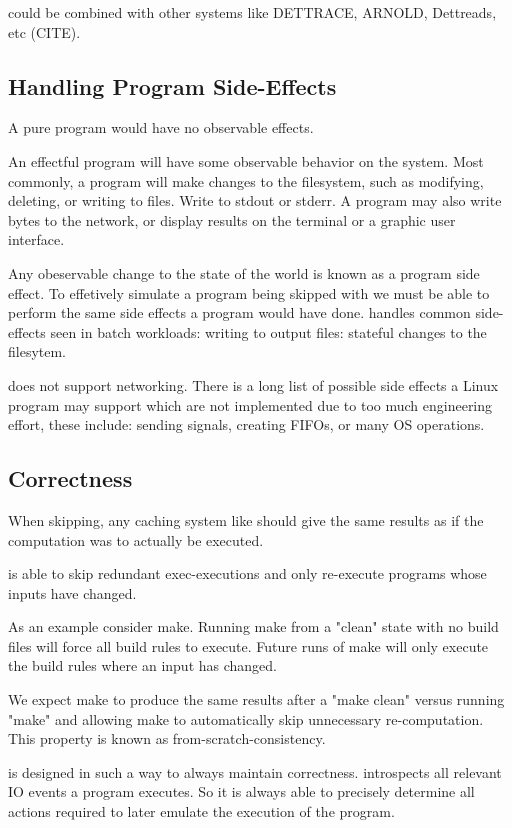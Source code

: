 \pc could be combined with other systems like DETTRACE, ARNOLD, Dettreads, etc (CITE).

\subsection{Handling Program Side-Effects}
A pure program would have no observable effects.

An effectful program will have some observable behavior on the system. Most commonly, a program will make
changes to the filesystem, such as modifying, deleting, or writing to files. Write to stdout or stderr.
A program may also write bytes to the network, or display results on the terminal or a graphic user
interface.

Any obeservable change to the state of the world is known as a program side effect. To effetively simulate
a program being skipped with \pc we must be able to perform the same side effects a program would have done. \pc handles common side-effects seen in batch workloads: writing to output files: stateful changes
to the filesytem.

\pc does not support networking. There is a long list of possible side effects a Linux program may
support which are not implemented due to too much engineering effort, these include: sending signals,
creating FIFOs, or many OS operations.

\subsection{Correctness}
When skipping, any caching system like \pc should give the same results as if the computation was to actually be executed.

\pc is able to skip redundant exec-executions and only re-execute programs whose inputs have changed.

As an example consider make. Running make from a "clean" state with no build files will force all build
rules to execute. Future runs of make will only execute the build rules where an input has changed.

We expect make to produce the same results after a "make clean" versus running "make" and allowing make
to automatically skip unnecessary re-computation. This property is known as from-scratch-consistency.

\pc is designed in such a way to always maintain correctness. \pc introspects all relevant IO
events a program executes. So it is always able to precisely determine all actions required to later
emulate the execution of the program.

